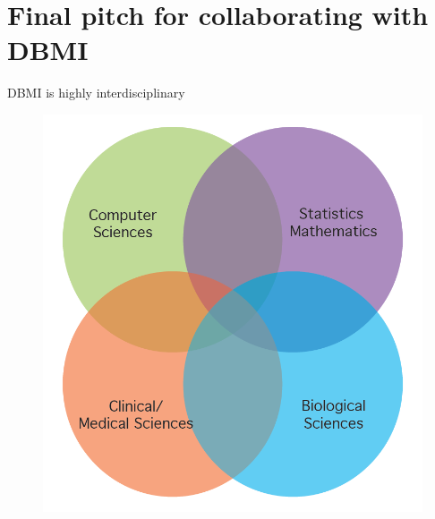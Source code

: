 \documentclass[11pt, aspectratio=43]{beamer}
\begin{document}
\section{Final pitch for collaborating with DBMI}
\begin{frame}{DBMI is highly interdisciplinary}

	\begin{figure}[h]
		\centering
		\includegraphics[scale=0.45]{Figures/venn.png}
	\end{figure}
	
\end{frame}
\end{document}
